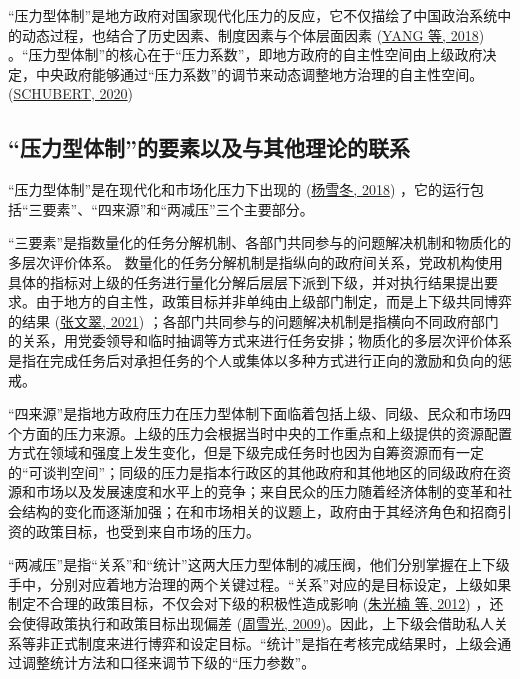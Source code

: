 \documentclass[
  12pt,
]{ctexart}
\begin{document}
``压力型体制''是地方政府对国家现代化压力的反应，它不仅描绘了中国政治系统中的动态过程，也结合了历史因素、制度因素与个体层面因素 (\protect\hyperlink{ref-YangYan2018}{YANG 等, 2018}) 。``压力型体制''的核心在于``压力系数''，即地方政府的自主性空间由上级政府决定，中央政府能够通过``压力系数''的调节来动态调整地方治理的自主性空间。 (\protect\hyperlink{ref-Schubert2020}{SCHUBERT, 2020})

\hypertarget{ux538bux529bux578bux4f53ux5236ux7684ux8981ux7d20ux4ee5ux53caux4e0eux5176ux4ed6ux7406ux8bbaux7684ux8054ux7cfb}{%
\subsection{``压力型体制''的要素以及与其他理论的联系}\label{ux538bux529bux578bux4f53ux5236ux7684ux8981ux7d20ux4ee5ux53caux4e0eux5176ux4ed6ux7406ux8bbaux7684ux8054ux7cfb}}

``压力型体制''是在现代化和市场化压力下出现的 (\protect\hyperlink{ref-YangXueDong2018}{杨雪冬, 2018}) ，它的运行包括``三要素''、``四来源''和``两减压''三个主要部分。

``三要素''是指数量化的任务分解机制、各部门共同参与的问题解决机制和物质化的多层次评价体系。 数量化的任务分解机制是指纵向的政府间关系，党政机构使用具体的指标对上级的任务进行量化分解后层层下派到下级，并对执行结果提出要求。由于地方的自主性，政策目标并非单纯由上级部门制定，而是上下级共同博弈的结果 (\protect\hyperlink{ref-ZhangWenCui2021}{张文翠, 2021}) ；各部门共同参与的问题解决机制是指横向不同政府部门的关系，用党委领导和临时抽调等方式来进行任务安排；物质化的多层次评价体系是指在完成任务后对承担任务的个人或集体以多种方式进行正向的激励和负向的惩戒。

``四来源''是指地方政府压力在压力型体制下面临着包括上级、同级、民众和市场四个方面的压力来源。上级的压力会根据当时中央的工作重点和上级提供的资源配置方式在领域和强度上发生变化，但是下级完成任务时也因为自筹资源而有一定的``可谈判空间''；同级的压力是指本行政区的其他政府和其他地区的同级政府在资源和市场以及发展速度和水平上的竞争；来自民众的压力随着经济体制的变革和社会结构的变化而逐渐加强；在和市场相关的议题上，政府由于其经济角色和招商引资的政策目标，也受到来自市场的压力。

``两减压''是指``关系''和``统计''这两大压力型体制的减压阀，他们分别掌握在上下级手中，分别对应着地方治理的两个关键过程。``关系''对应的是目标设定，上级如果制定不合理的政策目标，不仅会对下级的积极性造成影响 (\protect\hyperlink{ref-ZhuGuangNanEtAl2012}{朱光楠 等, 2012}) ，还会使得政策执行和政策目标出现偏差 (\protect\hyperlink{ref-ZhouXueGuang2009}{周雪光, 2009})。因此，上下级会借助私人关系等非正式制度来进行博弈和设定目标。``统计''是指在考核完成结果时，上级会通过调整统计方法和口径来调节下级的``压力参数''。
\end{document}
